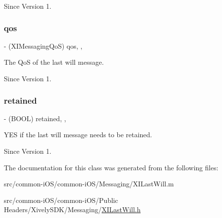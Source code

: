 \begin{DoxySince}{Since}
Version 1. 
\end{DoxySince}
\hypertarget{class_x_i_last_will_ac5e0aeaa6a123b07a7a20dcecdc5e115}{}\label{class_x_i_last_will_ac5e0aeaa6a123b07a7a20dcecdc5e115} 
\subsubsection{\texorpdfstring{qos}{qos}}
{\footnotesize\ttfamily -\/ (X\+I\+Messaging\+QoS) qos\hspace{0.3cm}{\ttfamily [read]}, {\ttfamily [nonatomic]}, {\ttfamily [assign]}}



The QoS of the last will message. 

\begin{DoxySince}{Since}
Version 1. 
\end{DoxySince}
\hypertarget{class_x_i_last_will_a04b48606877c0bd4cbec63e394ac0807}{}\label{class_x_i_last_will_a04b48606877c0bd4cbec63e394ac0807} 
\subsubsection{\texorpdfstring{retained}{retained}}
{\footnotesize\ttfamily -\/ (B\+O\+OL) retained\hspace{0.3cm}{\ttfamily [read]}, {\ttfamily [nonatomic]}, {\ttfamily [assign]}}



Y\+ES if the last will message needs to be retained. 

\begin{DoxySince}{Since}
Version 1. 
\end{DoxySince}


The documentation for this class was generated from the following files\+:\begin{DoxyCompactItemize}
\item 
src/common-\/i\+O\+S/common-\/i\+O\+S/\+Messaging/X\+I\+Last\+Will.\+m\item 
src/common-\/i\+O\+S/common-\/i\+O\+S/\+Public Headers/\+Xively\+S\+D\+K/\+Messaging/\hyperlink{_x_i_last_will_8h}{X\+I\+Last\+Will.\+h}\end{DoxyCompactItemize}
